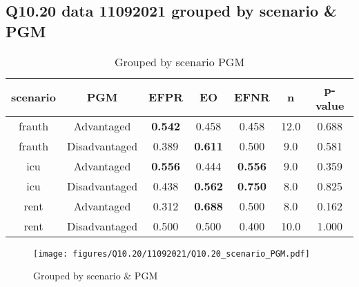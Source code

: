 \subsection{Q10.20 data 11092021 grouped by scenario \& PGM}

\begin{comment}
                             EFPR        EO      EFNR     n    pvalue
(frauth, Advantaged)     0.541667  0.458333  0.458333  12.0  0.688328
(frauth, Disadvantaged)  0.388889  0.611111  0.500000   9.0  0.580712
(icu, Advantaged)        0.555556  0.444444  0.555556   9.0  0.359375
(icu, Disadvantaged)     0.437500  0.562500  0.750000   8.0  0.825432
(rent, Advantaged)       0.312500  0.687500  0.500000   8.0  0.162441
(rent, Disadvantaged)    0.500000  0.500000  0.400000  10.0  1.000000
\end{comment}

\begin{table}[h]
    \centering
    \begin{tabular}{|c|c|c|c|c|c|c|}
        \hline
        scenario & PGM & EFPR & EO & EFNR & n & p-value\\
        \hline
        frauth & Advantaged & \textbf{0.542} & 0.458 & 0.458 & 12.0 & 0.688\\
		frauth & Disadvantaged & 0.389 & \textbf{0.611} & 0.500 & 9.0 & 0.581\\
		icu & Advantaged & \textbf{0.556} & 0.444 & \textbf{0.556} & 9.0 & 0.359\\
		icu & Disadvantaged & 0.438 & \textbf{0.562} & \textbf{0.750} & 8.0 & 0.825\\
		rent & Advantaged & 0.312 & \textbf{0.688} & 0.500 & 8.0 & 0.162\\
		rent & Disadvantaged & 0.500 & 0.500 & 0.400 & 10.0 & 1.000\\
		
        \hline
    \end{tabular}
    \caption{Grouped by scenario PGM}
    \label{tab:my_label}
\end{table}
\begin{figure}[h]
    \centering
    \texttt{[image: figures/Q10.20/11092021/Q10.20\_scenario\_PGM.pdf]}
    \caption{Grouped by scenario \& PGM}
    \label{fig:my_label}
\end{figure}
